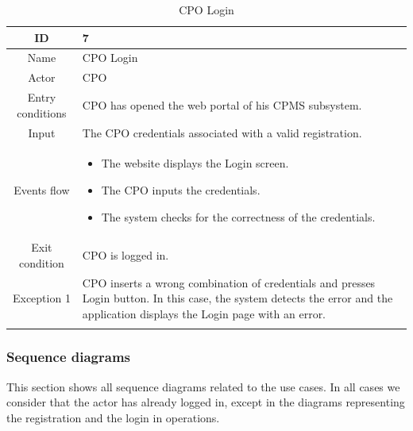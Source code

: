 
\begin{longtable}{|c| p{10cm}|}
    \hline ID        & 7\\
    \hline
    Name     & CPO Login \\
    \hline
    Actor            & CPO\\
    \hline 
    Entry conditions & CPO has opened the web portal of his CPMS subsystem.
        \\
    \hline
    Input & The CPO credentials associated with a valid registration.
    \\
    \hline
    Events flow      & \begin{itemize}[nosep,after=\strut]
        \item The website displays the Login screen.
        \item The CPO inputs the credentials.
        \item The system checks for the correctness of the credentials.
        \end{itemize} \\
    \hline
    Exit condition   & CPO is logged in.
    \\
    \hline
    Exception 1      & CPO inserts a wrong combination of credentials and presses Login button. In this case, the system detects the error and the application displays the Login page with an error. \\
    \hline
    \caption{CPO Login}\\
\end{longtable}
\subsubsection{Sequence diagrams}
This section shows all sequence diagrams related to the use cases. In all cases we consider that the actor has already logged in, except in the diagrams representing the registration and the login in operations.


